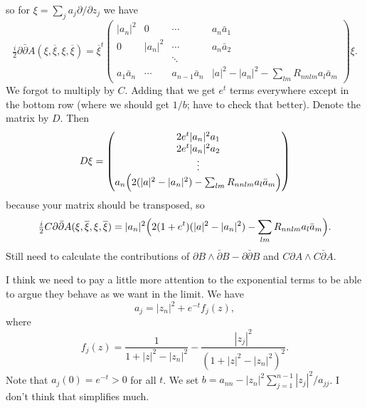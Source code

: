 \documentclass[10pt,a4paper]{amsart}
\def\ov#1{\overline{#1}}
\begin{document}
so for $\xi = \sum_j a_j \partial/\partial z_j$ we have
$$
\tfrac i2 \partial\bar\partial A(\xi,\ov\xi,\xi,\ov\xi)
=
\ov\xi^t \begin{pmatrix}
|a_n|^2 & 0 & \cdots & a_n \bar a_1
\\
0 & |a_n|^2 & \cdots & a_n \bar a_2
\\
& & \ddots &
\\
a_1 \bar a_n & \cdots & a_{n-1} \bar a_n &
|a|^2 - |a_n|^2 - \sum\limits_{lm} R_{nnlm} a_l \bar a_m
\end{pmatrix}
\xi.
$$
We forgot to multiply by $C$. Adding that we get
$e^{t}$ terms everywhere except in the bottom row
(where we should get $1/b$; have to check that better).
Denote the matrix by $D$.
Then
$$
D \xi
= \begin{pmatrix}
2 e^t |a_n|^2 a_1
\\
2 e^t |a_n|^2 a_2
\\
\vdots
\\
a_n \Bigl(
2(|a|^2 - |a_n|^2)
- \sum_{lm} R_{nnlm} a_l \bar a_m
\Bigr)
\end{pmatrix}
$$
because your matrix should be transposed,
so
$$
\tfrac i2 C \partial\bar\partial A(\xi,\ov\xi,\xi,\ov\xi)
= |a_n|^2\Bigl(
2(1+e^{t})(|a|^2 - |a_n|^2)
- \sum_{lm} R_{nnlm} a_l \bar a_m
\Bigr).
$$
Still need to calculate the contributions of
$\partial B \wedge \bar\partial B - \partial\bar\partial B$
and $C\partial A \wedge C \bar\partial A$.

I think we need to pay a little more attention to the exponential terms to
be able to argue they behave as we want in the limit.
We have
$$
a_j = |z_n|^2 + e^{-t} f_j(z),
$$
where
$$
f_j(z) = \frac{1}{1 + |z|^2 - |z_n|^2} - \frac{|z_j|^2}{(1+|z|^2-|z_n|^2)^2}.
$$
Note that $a_j(0) = e^{-t} > 0$ for all $t$.
We set $b = a_{nn} - |z_n|^2 \sum_{j=1}^{n-1} |z_j|^2/a_{jj}$.
I don't think that simplifies much.
\end{document}
